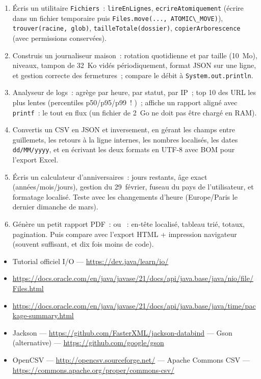 \begin{exercice}
\begin{enumerate}
  \item \'Ecris un utilitaire \verb|Fichiers|~: \verb|lireEnLignes|, \verb|ecrireAtomiquement|
        (\'ecrire dans un fichier temporaire puis \verb|Files.move(..., ATOMIC\_MOVE)|),
        \verb|trouver(racine, glob)|, \verb|tailleTotale(dossier)|, \verb|copierArborescence|
        (avec permissions conserv\'ees).
  \item Construis un journaliseur maison~: rotation quotidienne et par taille (10~Mo),
        niveaux, tampon de 32~Ko vid\'es p\'eriodiquement, format JSON sur une ligne,
        et gestion correcte des fermetures~; compare le d\'ebit \`a \verb|System.out.println|.
  \item Analyseur de logs~: agr\`ege par heure, par statut, par IP~; top 10 des URL les plus lentes
        (percentiles p50/p95/p99~! )~; affiche un rapport align\'e avec \verb|printf|~: le tout
        en flux (un fichier de 2~Go ne doit pas \^etre charg\'e en RAM).
  \item Convertis un CSV en JSON et inversement, en g\'erant les champs entre guillemets, les
        retours \`a la ligne internes, les nombres localis\'es, les dates \verb|dd/MM/yyyy|,
        et en \'ecrivant les deux formats en UTF-8 avec BOM pour l'export Excel.
  \item \'Ecris un calculateur d'anniversaires~: jours restants, \^age exact (ann\'ees/mois/jours),
        gestion du 29~f\'evrier, fuseau du pays de l'utilisateur, et formatage localis\'e.
        Teste avec les changements d'heure (Europe/Paris le dernier dimanche de mars).
  \item G\'en\`ere un petit rapport PDF~:  ou
        ~: en-t\^ete localis\'e, tableau tri\'e,
        totaux, pagination. Puis compare avec l'export HTML + impression navigateur (souvent
        suffisant, et dix fois moins de code).
\end{enumerate}
\end{exercice}

\begin{ressources}
\begin{itemize}
  \item Tutorial officiel I/O --- \url{https://dev.java/learn/io/}
  \item \url{https://docs.oracle.com/en/java/javase/21/docs/api/java.base/java/nio/file/Files.html}
  \item \url{https://docs.oracle.com/en/java/javase/21/docs/api/java.base/java/time/package-summary.html}
  \item Jackson --- \url{https://github.com/FasterXML/jackson-databind} --- Gson (alternative) --- \url{https://github.com/google/gson}
  \item OpenCSV --- \url{http://opencsv.sourceforge.net/} --- Apache Commons CSV --- \url{https://commons.apache.org/proper/commons-csv/}
\end{itemize}
\end{ressources}

